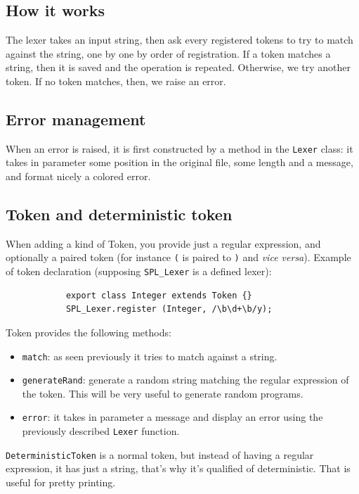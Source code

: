 \documentclass{article}
\newcommand\cc[1]{\lstinline{#1}}
\begin{document}
		\subsection{How it works}
		The lexer takes an input string, then ask every registered tokens to try to match against the string, one by one by order of registration. If a token matches a string, then it is saved and the operation is repeated. Otherwise, we try another token. If no token matches, then, we raise an error.

		\subsection{Error management}
		When an error is raised, it is first constructed by a method in the \cc{Lexer} class: it takes in parameter some position in the original file, some length and a message, and format nicely a colored error.

		\subsection{Token and deterministic token}\label{explainToken}
		When adding a kind of Token, you provide just a regular expression, and optionally a paired token (for instance \cc{(} is paired to \cc{)} and \textit{vice versa}). Example of token declaration (supposing \cc{SPL_Lexer} is a defined lexer):

		\begin{lstlisting}
			export class Integer extends Token {}
			SPL_Lexer.register (Integer, /\b\d+\b/y);
		\end{lstlisting}

		Token provides the following methods:
		\begin{itemize}
			\item \cc{match}: as seen previously it tries to match against a string.
			\item \cc{generateRand}: generate a random string matching the regular expression of the token. This will be very useful to generate random programs.
			\item \cc{error}: it takes in parameter a message and display an error using the previously described \cc{Lexer} function.
		\end{itemize}

		\cc{DeterministicToken} is a normal token, but instead of having a regular expression, it has just a string, that's why it's qualified of deterministic. That is useful for pretty printing.
\end{document}
